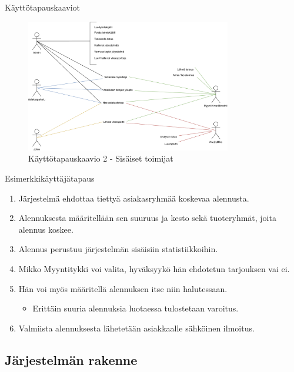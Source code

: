 \documentclass{beamer}
\begin{document}
\begin{frame}{Käyttötapauskaaviot}

	\begin{figure}[h]
		\includegraphics[width=0.8\textwidth]{../harjoitustyo/images/kayttotapauskaavio2.pdf}
		\caption{Käyttötapauskaavio 2 - Sisäiset toimijat}
	\end{figure}

\end{frame}

\begin{frame}{Esimerkkikäyttäjätapaus}
	\begin{enumerate}
		\item Järjestelmä ehdottaa tiettyä asiakasryhmää koskevaa alennusta.
		\item Alennuksesta määritellään sen suuruus ja kesto sekä tuoteryhmät, joita alennus koskee.
		\item Alennus perustuu järjestelmän sisäisiin statistiikkoihin.
		\item Mikko Myyntitykki voi valita, hyväksyykö hän ehdotetun tarjouksen vai ei.
		\item Hän voi myös määritellä alennuksen itse niin halutessaan.
			\begin{itemize}
				\item Erittäin suuria alennuksia luotaessa tulostetaan varoitus.
			\end{itemize}
		\item Valmiista alennuksesta lähetetään asiakkaalle sähköinen ilmoitus.
	\end{enumerate}
	
\end{frame}


\subsection{Järjestelmän rakenne}
\end{document}
